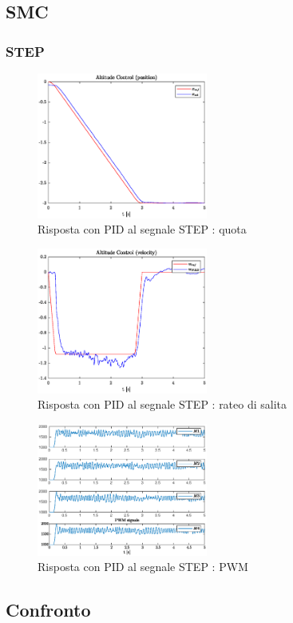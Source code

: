 \clearpage
\subsection{SMC}
\subsubsection{STEP}
\begin{figure}
	\centering
	\includegraphics[width=0.5\textwidth]{Simulazioni/Figure/SMC/STEP/AltitudeControlPos}
	\caption{Risposta con PID al segnale STEP : quota}
\end{figure}

\begin{figure}
	\centering
	\includegraphics[width=0.5\textwidth]{Simulazioni/Figure/SMC/STEP/AltitudeControlVel}
	\caption{Risposta con PID al segnale STEP : rateo di salita}
\end{figure}

\begin{figure}
	\centering
	\includegraphics[width=0.5\textwidth]{Simulazioni/Figure/SMC/STEP/PWM}
	\caption{Risposta con PID al segnale STEP : PWM}
\end{figure}

\clearpage
\subsection{Confronto}